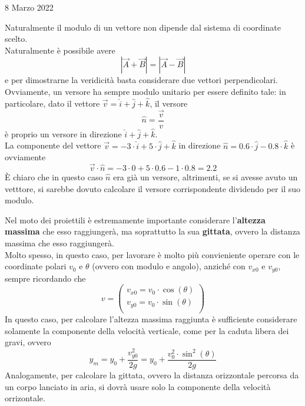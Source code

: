 \documentclass[a4paper]{extarticle}
\begin{document}
\newpage

\noindent
\begin{center}
  8 Marzo 2022
\end{center}
Naturalmente il modulo di un vettore non dipende dal sistema di coordinate scelto.\\
Naturalmente è possibile avere
\[\left \vert \vec{A} + \vec{B} \right \vert = \left \vert \vec{A} - \vec{B} \right \vert\]
e per dimostrarne la veridicità basta considerare due vettori perpendicolari.\\
Ovviamente, un versore ha sempre modulo unitario per essere definito tale: in particolare, dato il vettore $\vec{v} = \hat{i} + \hat{j} + \hat{k}$, il versore
\[\hat{n} = \frac{\vec{v}}{v}\]
è proprio un versore in direzione $\hat{i} + \hat{j} + \hat{k}$.\\
La componente del vettore $\vec{v} = -3 \cdot \hat{i} + 5 \cdot \hat{j} + \hat{k}$ in direzione $\hat{n} = 0.6 \cdot \hat{j} - 0.8 \cdot \hat{k}$ è ovviamente
\[\vec{v} \cdot \hat{n} = -3 \cdot 0 + 5 \cdot 0.6 - 1 \cdot 0.8 = 2.2\]
È chiaro che in questo caso $\hat{n}$ era già un versore, altrimenti, se si avesse avuto un vetttore, si sarebbe dovuto calcolare il versore corrispondente dividendo per il suo modulo.

\vspace{1em}
\noindent
Nel moto dei proiettili è estremamente importante considerare l'\textbf{altezza massima} che esso raggiungerà, ma soprattutto la sua \textbf{gittata}, ovvero la distanza massima che esso raggiungerà.\\
Molto spesso, in questo caso, per lavorare è molto più convieniente operare con le coordinate polari $v_0$ e $\theta$ (ovvero con modulo e angolo), anziché con $v_{x0}$ e $v_{y0}$, sempre ricordando che
\[v = \left(
  \begin{array}{l}
    v_{x0} = v_0 \cdot \cos(\theta)\\
    v_{y0} = v_0 \cdot \sin(\theta)\\
  \end{array}
\right)\]
In questo caso, per calcolare l'altezza massima raggiunta è sufficiente considerare solamente la componente della velocità verticale, come per la caduta libera dei gravi, ovvero
\[y_m = y_0 + \frac{v_{y0}^2}{2g} = y_0 + \frac{v_0^2 \cdot \sin^2(\theta)}{2g}\]
Analogamente, per calcolare la gittata, ovvero la distanza orizzontale percorsa da un corpo lanciato in aria, si dovrà usare solo la componente della velocità orrizontale.
\end{document}
